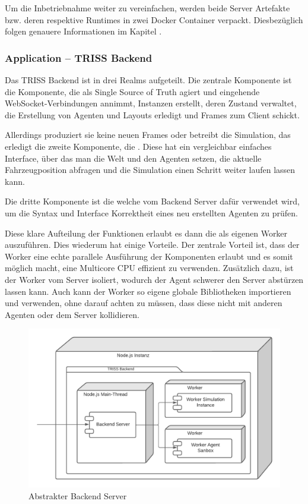Um die Inbetriebnahme weiter zu vereinfachen, werden beide Server Artefakte bzw. deren respektive Runtimes in zwei Docker Container verpackt.
Diesbezüglich folgen genauere Informationen im Kapitel .

\subsubsection{Application – TRISS Backend}
\label{sec:triss-backend-component}

Das TRISS Backend ist in drei Realms aufgeteilt.
Die zentrale Komponente ist die  Komponente, die als Single Source of Truth agiert und eingehende WebSocket-Verbindungen annimmt, Instanzen erstellt, deren Zustand verwaltet, die Erstellung von Agenten und Layouts erledigt und Frames zum Client schickt.

Allerdings produziert sie keine neuen Frames oder betreibt die Simulation, das erledigt die zweite Komponente, die .
Diese hat ein vergleichbar einfaches Interface, über das man die Welt und den Agenten setzen, die aktuelle Fahrzeugposition abfragen und die Simulation einen Schritt weiter laufen lassen kann.

Die dritte Komponente ist die  welche vom Backend Server dafür verwendet wird, um die Syntax und Interface Korrektheit eines neu erstellten Agenten zu prüfen.

Diese klare Aufteilung der Funktionen erlaubt es dann die  als eigenen Worker auszuführen.
Dies wiederum hat einige Vorteile.
Der zentrale Vorteil ist, dass der Worker eine echte parallele Ausführung der Komponenten erlaubt und es somit möglich macht, eine Multicore CPU effizient zu verwenden.
Zusätzlich dazu, ist der Worker vom Server isoliert, wodurch der Agent schwerer den Server abstürzen lassen kann.
Auch kann der Worker so eigene globale Bibliotheken importieren und verwenden, ohne darauf achten zu müssen, dass diese nicht mit anderen Agenten oder dem Server kollidieren.

\begin{figure}[htb]
    \centering
    \includegraphics[scale=.65,center]{medien/triss-backend.pdf}
    \caption{Abstrakter Backend Server}
    \ownsource
    \label{fig:triss-backend}
\end{figure}

